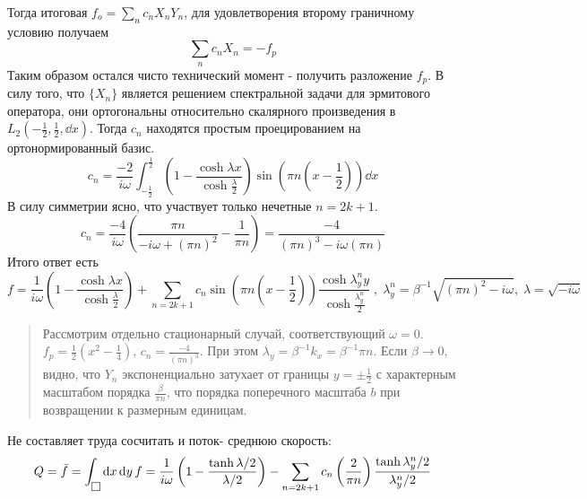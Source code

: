 \documentclass[a4paper,12pt]{article}
\theoremstyle{plain} %
\theoremstyle{definition} %
\theoremstyle{remark} %
\begin{document}
Тогда итоговая $f_o = \sum_n  c_n X_n Y_n$, для удовлетворения второму граничному условию получаем 
\begin{equation}
    \sum_n c_n X_n = - f_p
\end{equation}
Таким образом остался чисто технический момент - получить разложение $f_p$.
В силу того, что $\{X_n\}$ является решением спектральной задачи для эрмитового оператора, они ортогональны относительно скалярного произведения в $L_2(-\frac{1}{2},\frac{1}{2}, \dd{x})$.
Тогда $c_n$ находятся простым проецированием на ортонормированный базис.
\begin{equation}
    c_n = \frac{-2}{i\omega} \int_{-\frac{1}{2}}^{\frac{1}{2}} \left(1-\frac{\cosh{\lambda x}}{\cosh{\frac{\lambda}{2}}}\right) \sin(\pi n \left(x-\frac{1}{2}\right))\dd{x}
\end{equation}
В силу симметрии ясно, что участвует только нечетные $n=2k+1$.
\begin{equation}\boxed{
    c_n = \frac{-4}{i\omega}\left(\frac{\pi n}{-i\omega + (\pi n)^2} - \frac{1}{\pi n}\right) = \frac{-4}{(\pi n)^3 - i\omega (\pi n)}}
\end{equation}
Итого ответ есть 
\begin{equation}\boxed{
    f = \frac{1}{i\omega}
    \left(1-\frac{\cosh{\lambda x}}{\cosh{\frac{\lambda}{2}}}\right) + \sum_{n=2k+1} c_n \sin(\pi n \left(x-\frac{1}{2}\right)) \frac{\cosh{\lambda_y^n y }}{\cosh{\frac{\lambda_y^n}{2}}}} \;,\;  \lambda_y^n = \beta^{-1}\sqrt{(\pi n)^2 - i\omega}, \; \lambda = \sqrt{-i\omega}
\end{equation}
\begin{quote}
    Рассмотрим отдельно стационарный случай, соответствующий $\omega=0$.
    $f_p = \frac{1}{2}(x^2 - \frac{1}{4})$, $c_n = \frac{-4}{(\pi n)^3}$.
    При этом $\lambda_y = \beta^{-1} k_x = \beta^{-1} \pi n$. Если $\beta \to 0$, видно, что $Y_n$ экспоненциально затухает от границы $y=\pm \frac{1}{2}$  с характерным масштабом порядка $\frac{\beta}{\pi n}$, что порядка поперечного масштаба $b$ при возвращении к размерным единицам.
\end{quote}
Не составляет труда сосчитать и поток- среднюю скорость:
\begin{equation}
    Q = \bar{f}=\int_{\fbox{}} \dd{x}\dd{y} f = \frac{1}{i\omega} \left(1-\frac{\tanh{\lambda/2}}{\lambda/2}\right) - \sum_{n=2k+1}c_n\left(\frac{2}{\pi n}\right)\frac{\tanh{\lambda_y^n/2}}{\lambda_y^n/2}
\end{equation}
\end{document}
